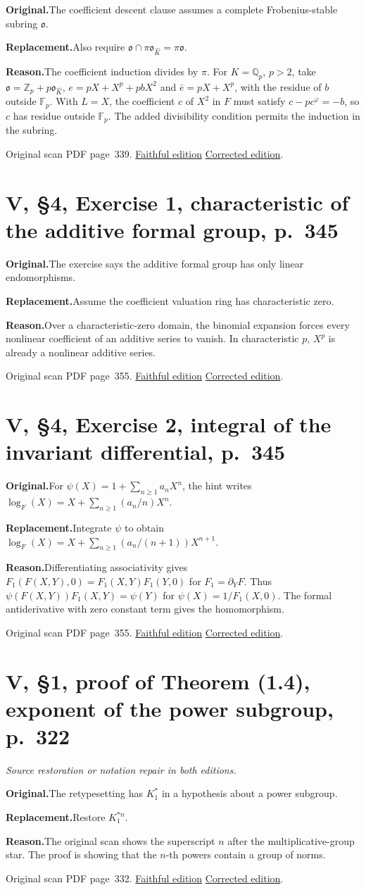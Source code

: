 \documentclass[11pt,a4paper]{article}
\newcommand{\original}{\par\smallskip\noindent\textbf{Original.}\enspace}
\newcommand{\replacement}{\par\smallskip\noindent\textbf{Replacement.}\enspace}
\newcommand{\reason}{\par\smallskip\noindent\textbf{Reason.}\enspace}
\newcommand{\editionlink}[3]{\href{#1\#errata.#2}{#3}}
\newcommand{\location}[2]{%
  \par\smallskip\noindent Original scan PDF page~#2.\enspace
  \editionlink{Neukirch_Faithful.pdf}{#1}{Faithful edition}
  \quad\editionlink{Neukirch_Corrected.pdf}{#1}{Corrected edition}.}
\begin{document}
\original The coefficient descent clause assumes a complete Frobenius-stable subring $\mathfrak o$.
\replacement Also require $\mathfrak o\cap\pi\mathfrak o_{\widehat K}=\pi\mathfrak o$.
\reason The coefficient induction divides by $\pi$. For $K=\mathbb Q_p$, $p>2$, take $\mathfrak o=\mathbb Z_p+p\mathfrak o_{\widehat K}$, $e=pX+X^p+pbX^2$ and $\bar e=pX+X^p$, with the residue of $b$ outside $\mathbb F_p$. With $L=X$, the coefficient $c$ of $X^2$ in $F$ must satisfy $c-pc^\varphi=-b$, so $c$ has residue outside $\mathbb F_p$. The added divisibility condition permits the induction in the subring.
\location{126}{339}

\setcounter{section}{126}
\section{V, \S4, Exercise 1, characteristic of the additive formal group, p.~345}\label{errata:item:127}

\original The exercise says the additive formal group has only linear endomorphisms.
\replacement Assume the coefficient valuation ring has characteristic zero.
\reason Over a characteristic-zero domain, the binomial expansion forces every nonlinear coefficient of an additive series to vanish. In characteristic $p$, $X^p$ is already a nonlinear additive series.
\location{127}{355}

\setcounter{section}{127}
\section{V, \S4, Exercise 2, integral of the invariant differential, p.~345}\label{errata:item:128}

\original For $\psi(X)=1+\sum_{n\ge1}a_nX^n$, the hint writes $\log_F(X)=X+\sum_{n\ge1}(a_n/n)X^n$.
\replacement Integrate $\psi$ to obtain $\log_F(X)=X+\sum_{n\ge1}(a_n/(n+1))X^{n+1}$.
\reason Differentiating associativity gives $F_1(F(X,Y),0)=F_1(X,Y)F_1(Y,0)$ for $F_1=\partial_Y F$. Thus $\psi(F(X,Y))F_1(X,Y)=\psi(Y)$ for $\psi(X)=1/F_1(X,0)$. The formal antiderivative with zero constant term gives the homomorphism.
\location{128}{355}

\setcounter{section}{128}
\section{V, \S1, proof of Theorem (1.4), exponent of the power subgroup, p.~322}\label{errata:item:129}
\noindent\emph{Source restoration or notation repair in both editions.}\par
\original The retypesetting has $K_1^*$ in a hypothesis about a power subgroup.
\replacement Restore $K_1^{*n}$.
\reason The original scan shows the superscript $n$ after the multiplicative-group star. The proof is showing that the $n$-th powers contain a group of norms.
\location{129}{332}
\end{document}
